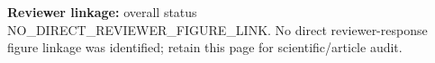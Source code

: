 \textbf{Reviewer linkage:} overall status NO\_DIRECT\_REVIEWER\_FIGURE\_LINK.
No direct reviewer-response figure linkage was identified; retain this page for scientific/article audit.
